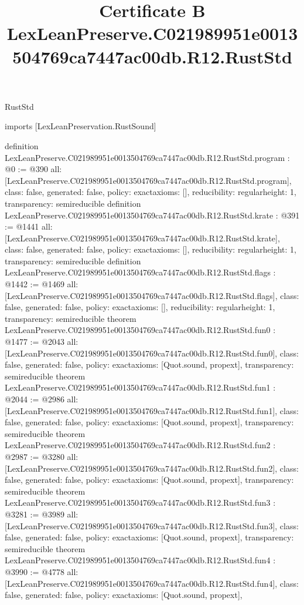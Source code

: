 \begin{lexlean}{RustStd}
\title{Certificate B LexLeanPreserve.C021989951e0013504769ca7447ac00db.R12.RustStd}
\begin{coremodule}
imports [LexLeanPreservation.RustSound]

definition LexLeanPreserve.C021989951e0013504769ca7447ac00db.R12.RustStd.program : @0 := @390 {
  all: [LexLeanPreserve.C021989951e0013504769ca7447ac00db.R12.RustStd.program],
  class: false,
  generated: false,
  policy: exact{axioms: []},
  reducibility: regular{height: 1},
  transparency: semireducible
}
definition LexLeanPreserve.C021989951e0013504769ca7447ac00db.R12.RustStd.krate : @391 := @1441 {
  all: [LexLeanPreserve.C021989951e0013504769ca7447ac00db.R12.RustStd.krate],
  class: false,
  generated: false,
  policy: exact{axioms: []},
  reducibility: regular{height: 1},
  transparency: semireducible
}
definition LexLeanPreserve.C021989951e0013504769ca7447ac00db.R12.RustStd.flags : @1442 := @1469 {
  all: [LexLeanPreserve.C021989951e0013504769ca7447ac00db.R12.RustStd.flags],
  class: false,
  generated: false,
  policy: exact{axioms: []},
  reducibility: regular{height: 1},
  transparency: semireducible
}
theorem LexLeanPreserve.C021989951e0013504769ca7447ac00db.R12.RustStd.fun0 : @1477 := @2043 {
  all: [LexLeanPreserve.C021989951e0013504769ca7447ac00db.R12.RustStd.fun0],
  class: false,
  generated: false,
  policy: exact{axioms: [Quot.sound, propext]},
  transparency: semireducible
}
theorem LexLeanPreserve.C021989951e0013504769ca7447ac00db.R12.RustStd.fun1 : @2044 := @2986 {
  all: [LexLeanPreserve.C021989951e0013504769ca7447ac00db.R12.RustStd.fun1],
  class: false,
  generated: false,
  policy: exact{axioms: [Quot.sound, propext]},
  transparency: semireducible
}
theorem LexLeanPreserve.C021989951e0013504769ca7447ac00db.R12.RustStd.fun2 : @2987 := @3280 {
  all: [LexLeanPreserve.C021989951e0013504769ca7447ac00db.R12.RustStd.fun2],
  class: false,
  generated: false,
  policy: exact{axioms: [Quot.sound, propext]},
  transparency: semireducible
}
theorem LexLeanPreserve.C021989951e0013504769ca7447ac00db.R12.RustStd.fun3 : @3281 := @3989 {
  all: [LexLeanPreserve.C021989951e0013504769ca7447ac00db.R12.RustStd.fun3],
  class: false,
  generated: false,
  policy: exact{axioms: [Quot.sound, propext]},
  transparency: semireducible
}
theorem LexLeanPreserve.C021989951e0013504769ca7447ac00db.R12.RustStd.fun4 : @3990 := @4778 {
  all: [LexLeanPreserve.C021989951e0013504769ca7447ac00db.R12.RustStd.fun4],
  class: false,
  generated: false,
  policy: exact{axioms: [Quot.sound, propext]},
}
\end{coremodule}
\end{lexlean}

